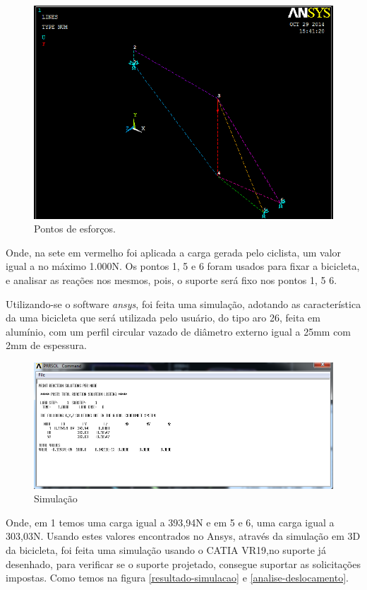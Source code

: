 \begin{figure}[h]
\centering
\includegraphics[scale=0.5]{figuras/3D_bike.png}
\caption{Pontos de esforços.}
\label{pontos-esforcos}
\end{figure}

Onde, na sete em vermelho foi aplicada a carga gerada pelo ciclista, um valor igual a no máximo 1.000N. Os pontos 1, 5 e 6 foram usados para fixar a bicicleta, e analisar as reações nos mesmos, pois, o suporte será fixo nos pontos 1, 5 6.

Utilizando-se o software \textit{ansys}, foi feita uma simulação, adotando as característica da uma bicicleta que será utilizada pelo usuário, do tipo aro 26, feita em alumínio, com um perfil circular vazado de diâmetro externo igual a 25mm com 2mm de espessura.

\begin{figure}[h]
\centering
\includegraphics[scale=0.5]{figuras/reacoes.png}
\caption{Simulação}
\end{figure}

Onde, em 1 temos uma carga igual a 393,94N e em 5 e 6, uma carga igual a 303,03N. Usando estes valores encontrados no Ansys, através da simulação em 3D da bicicleta, foi feita uma simulação usando o CATIA VR19,no suporte já desenhado, para verificar se o suporte projetado, consegue suportar as solicitações impostas. Como temos na figura \ref{resultado-simulacao} e \ref{analise-deslocamento}.

